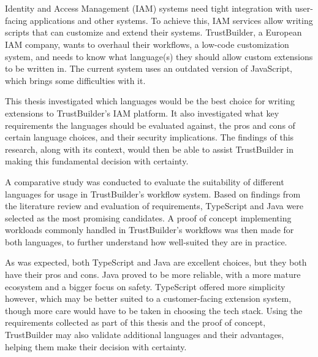 \chapter*{}



Identity and Access Management (IAM) systems need tight integration with user-facing applications and other systems. To achieve this, IAM services allow writing scripts that can customize and extend their systems. TrustBuilder, a European IAM company, wants to overhaul their workflows, a low-code customization system, and needs to know what language(s) they should allow custom extensions to be written in. The current system uses an outdated version of JavaScript, which brings some difficulties with it.

This thesis investigated which languages would be the best choice for writing extensions to TrustBuilder's IAM platform. It also investigated what key requirements the languages should be evaluated against, the pros and cons of certain language choices, and their security implications. The findings of this research, along with its context, would then be able to assist TrustBuilder in making this fundamental decision with certainty.

A comparative study was conducted to evaluate the suitability of different languages for usage in TrustBuilder's workflow system. Based on findings from the literature review and evaluation of requirements, TypeScript and Java were selected as the most promising candidates. A proof of concept implementing workloads commonly handled in TrustBuilder's workflows was then made for both languages, to further understand how well-suited they are in practice.

As was expected, both TypeScript and Java are excellent choices, but they both have their pros and cons. Java proved to be more reliable, with a more mature ecosystem and a bigger focus on safety. TypeScript offered more simplicity however, which may be better suited to a customer-facing extension system, though more care would have to be taken in choosing the tech stack. Using the requirements collected as part of this thesis and the proof of concept, TrustBuilder may also validate additional languages and their advantages, helping them make their decision with certainty.
